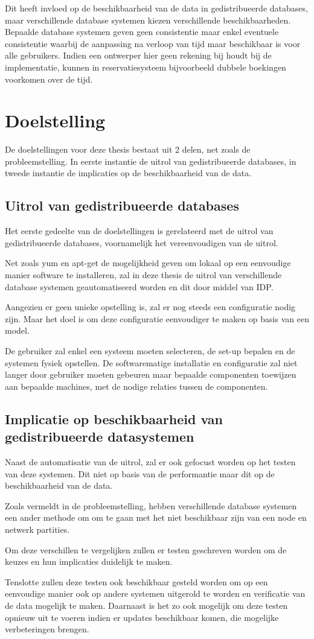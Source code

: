 Dit heeft invloed op de beschikbaarheid van de data in gedistribueerde databases, maar verschillende database systemen kiezen verschillende beschikbaarheden. Bepaalde database systemen geven geen consistentie maar enkel eventuele consistentie waarbij de aanpassing na verloop van tijd maar beschikbaar is voor alle gebruikers. Indien een ontwerper hier geen rekening bij houdt bij de implementatie, kunnen in reservatiesysteem bijvoorbeeld dubbele boekingen voorkomen over de tijd. 

\section{Doelstelling}
De doelstellingen voor deze thesis bestaat uit 2 delen, net zoals de probleemstelling. In eerste instantie de uitrol van gedistribueerde databases, in tweede instantie de implicaties op de beschikbaarheid van de data. 

\subsection{Uitrol van gedistribueerde databases}
Het eerste gedeelte van de doelstellingen is gerelateerd met de uitrol van gedistribueerde databases, voornamelijk het vereenvoudigen van de uitrol. 

Net zoals \gls{yum} en \gls{apt-get} de mogelijkheid geven om lokaal op een eenvoudige manier software te installeren, zal in deze thesis de uitrol van verschillende database systemen geautomatiseerd worden en dit door middel van \gls{IDP}. 

Aangezien er geen unieke opstelling is, zal er nog steeds een configuratie nodig zijn. Maar het doel is om deze configuratie eenvoudiger te maken op basis van een model. 

De gebruiker zal enkel een systeem moeten selecteren, de set-up bepalen en de systemen fysiek opstellen. De softwarematige installatie en configuratie zal niet langer door gebruiker moeten gebeuren maar bepaalde componenten toewijzen aan bepaalde machines, met de nodige relaties tussen de componenten. 

\subsection{Implicatie op beschikbaarheid van gedistribueerde datasystemen} 
Naast de automatisatie van de uitrol, zal er ook gefocust worden op het testen van deze systemen. Dit niet op basis van de performantie maar dit op de beschikbaarheid van de data. 

Zoals vermeldt in de probleemstelling, hebben verschillende database systemen een ander methode om om te gaan met het niet beschikbaar zijn van een node en netwerk partities. 

Om deze verschillen te vergelijken zullen er testen geschreven worden om de keuzes en hun implicaties duidelijk te maken. 

Tenslotte zullen deze testen ook beschikbaar gesteld worden om op een eenvoudige manier ook op andere systemen uitgerold te worden en verificatie van de data mogelijk te maken. Daarnaast is het zo ook mogelijk om deze testen opnieuw uit te voeren indien er updates beschikbaar komen, die mogelijke verbeteringen brengen. 
